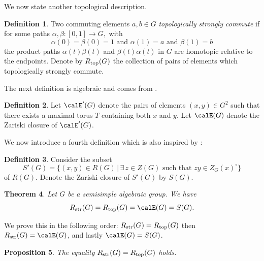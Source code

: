 \documentclass[12pt, a4paper, oneside]{amsart}
\theoremstyle{plain} %
\newtheorem{theorem}{Theorem}
\newtheorem{proposition}[theorem]{Proposition}
\theoremstyle{definition} %
\newtheorem{definition}[theorem]{Definition}
\theoremstyle{remark} %
\begin{document}
We now state another topological description.

\begin{definition}\label{def:top}
Two commuting elements $a,b\in G$ \emph{topologically strongly commute} if for some paths $\alpha,\beta :[0,1]\to G,$ with 
\begin{equation}\label{eq:path}
\alpha(0)=\beta(0)=1\,\, \text{and}\,\,
 \alpha(1)=a\,\, \text{and}\,\, \beta(1)=b
 \end{equation}
the product paths $\alpha(t)\beta(t)$ and $\beta(t)\alpha(t)$ in $G$ are homotopic relative to the endpoints. Denote by $R_{\rm top}(G)$ the collection of pairs of elements which topologically strongly commute.
\end{definition}

The next definition is algebraic and comes from \cite[\S 3]{Ric79}.
\begin{definition}\label{def:alg}
Let $\calE'(G)$ denote the pairs of elements $(x,y)\in G^2$ such that there exists a maximal torus $T$ containing both $x$ and $y$. Let $\calE(G)$ denote the Zariski closure of $\calE'(G)$.
\end{definition}

We now introduce a fourth definition which is also inspired by \cite[\S 3]{Ric79}:
\begin{definition}
Consider the subset 
\[S'(G) = \{(x,y)\in R(G)\,|\, \exists\, z\in Z(G)\,\, \text{such that}\,\, zy\in Z_G(x)^\circ\}\]
of $R(G)$. Denote the Zariski closure of $S'(G)$ by $S(G)$.
\end{definition}

\begin{theorem}
Let $G$ be a semisimple algebraic group. We have
\[R_{\rm str}(G)=R_{\rm top}(G)=\calE(G)=S(G).\]
\end{theorem}



We prove this in the following order: $R_{\rm str}(G)=R_{\rm top}(G)$ then $R_{\rm str}(G)=\calE(G)$, and lastly $\calE(G)=S(G)$. 

\medskip

\begin{proposition}
The equality $R_{\rm str}(G) = R_{\rm top}(G)$ holds.
\end{proposition}
\end{document}
